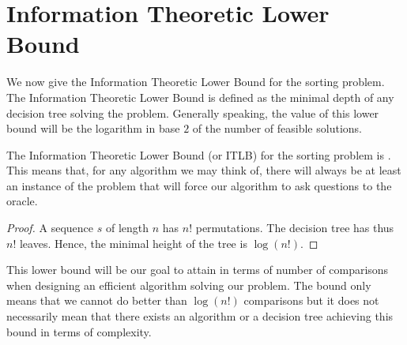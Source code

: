 \section{Information Theoretic Lower Bound}
\label{tree:sorting:ITLB}

We now give the Information Theoretic Lower Bound for the sorting problem. The
Information Theoretic Lower Bound is defined as the minimal depth of any
decision tree solving the problem. Generally speaking, the value of this lower
bound will be the logarithm in base \(2\) of the number of feasible solutions.


\begin{theorem}
The Information Theoretic Lower Bound (or ITLB) for the sorting problem is
. This means that, for any algorithm we may think of,
there will always be at least an instance of the problem that will force our
algorithm to ask  questions to the oracle.
\end{theorem}

\begin{proof}
A sequence \(s\) of length \(n\) has \(n!\) permutations. The decision tree has thus
\(n!\) leaves. Hence, the minimal height of the tree is \(\log(n!)\).
\end{proof}

This lower bound will be our goal to attain in terms of number of comparisons
when designing an efficient algorithm solving our problem. The bound only means
that we cannot do better than \(\log(n!)\) comparisons but it does not
necessarily mean that there exists an algorithm or a decision tree achieving
this bound in terms of complexity.
